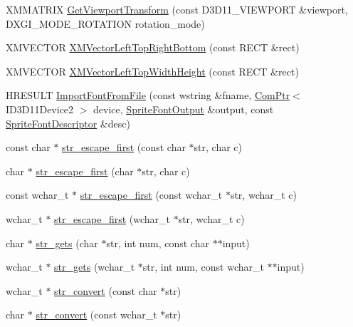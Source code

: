 \begin{DoxyCompactItemize}
\item 
X\+M\+M\+A\+T\+R\+IX \hyperlink{namespacemage_a0191746ac9322d40db5863b59624719a}{Get\+Viewport\+Transform} (const D3\+D11\+\_\+\+V\+I\+E\+W\+P\+O\+RT \&viewport, D\+X\+G\+I\+\_\+\+M\+O\+D\+E\+\_\+\+R\+O\+T\+A\+T\+I\+ON rotation\+\_\+mode)
\item 
X\+M\+V\+E\+C\+T\+OR \hyperlink{namespacemage_a34342faaa7525d7180807df03687aa86}{X\+M\+Vector\+Left\+Top\+Right\+Bottom} (const R\+E\+CT \&rect)
\item 
X\+M\+V\+E\+C\+T\+OR \hyperlink{namespacemage_abda051097e5b76fb65983141822cb170}{X\+M\+Vector\+Left\+Top\+Width\+Height} (const R\+E\+CT \&rect)
\item 
H\+R\+E\+S\+U\+LT \hyperlink{namespacemage_a2ea37125a432c1c2fb7e87956868329a}{Import\+Font\+From\+File} (const wstring \&fname, \hyperlink{namespacemage_ae74f374780900893caa5555d1031fd79}{Com\+Ptr}$<$ I\+D3\+D11\+Device2 $>$ device, \hyperlink{structmage_1_1_sprite_font_output}{Sprite\+Font\+Output} \&output, const \hyperlink{structmage_1_1_sprite_font_descriptor}{Sprite\+Font\+Descriptor} \&desc)
\item 
const char $\ast$ \hyperlink{namespacemage_a451f2cac5de5cebbe8bc004b3f29857b}{str\+\_\+escape\+\_\+first} (const char $\ast$str, char c)
\item 
char $\ast$ \hyperlink{namespacemage_a7a7fa3e9439ddbe1f31fe888a2a70e3d}{str\+\_\+escape\+\_\+first} (char $\ast$str, char c)
\item 
const wchar\+\_\+t $\ast$ \hyperlink{namespacemage_ac47b9d026e0ddda47b3d889beb40a2d9}{str\+\_\+escape\+\_\+first} (const wchar\+\_\+t $\ast$str, wchar\+\_\+t c)
\item 
wchar\+\_\+t $\ast$ \hyperlink{namespacemage_a8fbccb44f38a2e8b09baf805e9f34fc1}{str\+\_\+escape\+\_\+first} (wchar\+\_\+t $\ast$str, wchar\+\_\+t c)
\item 
char $\ast$ \hyperlink{namespacemage_ab7f63cc8e67ba97382747bc75fd75f62}{str\+\_\+gets} (char $\ast$str, int num, const char $\ast$$\ast$input)
\item 
wchar\+\_\+t $\ast$ \hyperlink{namespacemage_a881ab89db7712612531d47a64c6dfaa1}{str\+\_\+gets} (wchar\+\_\+t $\ast$str, int num, const wchar\+\_\+t $\ast$$\ast$input)
\item 
wchar\+\_\+t $\ast$ \hyperlink{namespacemage_af66894bb89e0f2ca0e7b9028c8039a07}{str\+\_\+convert} (const char $\ast$str)
\item 
char $\ast$ \hyperlink{namespacemage_a02da62c4ad787817700a446e56739270}{str\+\_\+convert} (const wchar\+\_\+t $\ast$str)

\end{DoxyCompactItemize}
